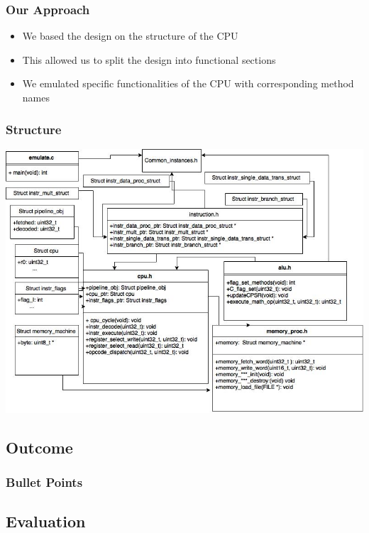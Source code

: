 \documentclass{beamer}
\begin{document}
\begin{frame}
\frametitle{Our Approach}

\begin{itemize}
\item We based the design on the structure of the CPU
\item This allowed us to split the design into functional sections
\item We emulated specific functionalities of the CPU with corresponding method names
\end{itemize}

\end{frame}
\begin{frame}
\frametitle{Structure}
\includegraphics[width=0.9\linewidth]{Images/Emulator_XML(2).jpg}
\end{frame}


\subsection{Outcome}
\begin{frame}
\frametitle{Bullet Points}




\end{frame}

\subsection{Evaluation}
\end{document}

